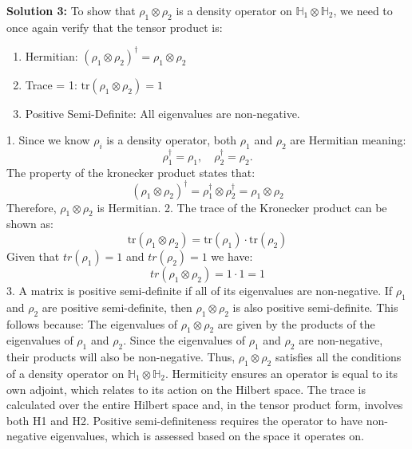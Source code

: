 \documentclass{article}
\renewcommand{\H}{\mathbb{H}}
\begin{document}
\textbf{Solution 3:} To show that $\rho_1 \otimes \rho_2$ is a density operator on $\H_1 \otimes \H_2$, we need to once again verify that the tensor product is:
\begin{enumerate}
    \item Hermitian: \((\rho_1 \otimes \rho_2)^\dagger = \rho_1 \otimes \rho_2\)
    \item Trace = 1: \(\text{tr}(\rho_1 \otimes \rho_2) = 1\)
    \item Positive Semi-Definite: All eigenvalues are non-negative.
\end{enumerate}
1. Since we know $\rho_i$ is a density operator, both $\rho_1$ and $\rho_2$ are Hermitian meaning: $$\rho_1^\dagger=\rho_1, \quad \rho_2^\dagger=\rho_2.$$ The property of the kronecker product states that: $$(\rho_1 \otimes \rho_2)^\dagger = \rho_1^\dagger \otimes \rho_2^\dagger = \rho_1 \otimes \rho_2$$ Therefore, \(\rho_1 \otimes \rho_2\) is Hermitian.
2. The trace of the Kronecker product can be shown as: $$\text{tr}(\rho_1 \otimes \rho_2) = \text{tr}(\rho_1) \cdot \text{tr}(\rho_2)$$ Given that $tr(\rho_1)=1$ and $tr(\rho_2)=1$ we have: $$tr(\rho_1 \otimes \rho_2) = 1 \cdot 1 = 1$$
3. A matrix is positive semi-definite if all of its eigenvalues are non-negative. If \(\rho_1\) and \(\rho_2\) are positive semi-definite, then \(\rho_1 \otimes \rho_2\) is also positive semi-definite. This follows because: The eigenvalues of \(\rho_1 \otimes \rho_2\) are given by the products of the eigenvalues of \(\rho_1\) and \(\rho_2\).
Since the eigenvalues of \(\rho_1\) and \(\rho_2\) are non-negative, their products will also be non-negative. Thus, \(\rho_1 \otimes \rho_2\) satisfies all the conditions of a density operator on \(\mathbb{H}_1 \otimes \mathbb{H}_2\).
Hermiticity ensures an operator is equal to its own adjoint, which relates to its action on the Hilbert space. The trace is calculated over the entire Hilbert space and, in the tensor product form, involves both H1 and H2. Positive semi-definiteness requires the operator to have non-negative eigenvalues, which is assessed based on the space it operates on.
\end{document}
